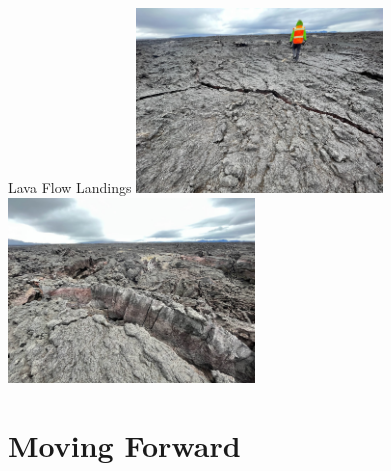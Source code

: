 \documentclass[aspectratio=169]{beamer}
\begin{document}
\begin{frame}{Lava Flow Landings}
	\centering
	\includegraphics[width=0.49\textwidth]{./images/holuhraun_smooth}
	\includegraphics[width=0.49\textwidth]{./images/holuhraun_rough}
\end{frame}

\section{Moving Forward}
\end{document}
